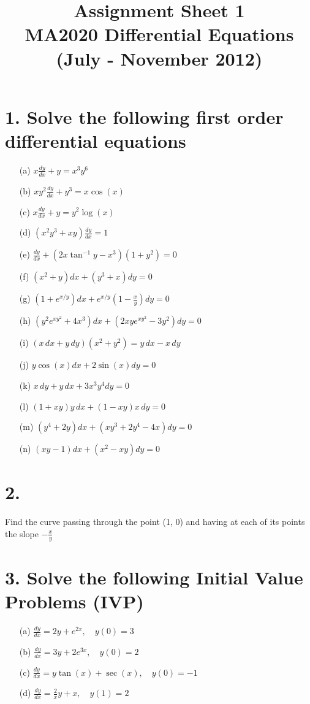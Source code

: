 \documentclass[12pt]{article}
\title{Assignment Sheet 1\\ \large MA2020 Differential Equations (July - November 2012)}
\date{}
\begin{document}
\maketitle

\section*{1. Solve the following first order differential equations}

\begin{enumerate}
  \item[(a)] $ x \frac{dy}{dx} + y = x^3 y^6 $
  \item[(b)] $ x y^2 \frac{dy}{dx} + y^3 = x \cos(x) $
  \item[(c)] $ x \frac{dy}{dx} + y = y^2 \log(x) $
  \item[(d)] $ (x^2 y^3 + x y) \frac{dy}{dx} = 1 $
  \item[(e)] $ \frac{dy}{dx} + (2x \tan^{-1} y - x^3)(1 + y^2) = 0 $
  \item[(f)] $ (x^2 + y)dx + (y^3 + x)dy = 0 $
  \item[(g)] $ (1 + e^{x/y})dx + e^{x/y}\left(1 - \frac{x}{y}\right)dy = 0 $
  \item[(h)] $ (y^2 e^{x y^2} + 4x^3)dx + (2x y e^{x y^2} - 3y^2)dy = 0 $
  \item[(i)] $ (x\,dx + y\,dy)(x^2 + y^2) = y\,dx - x\,dy $
  \item[(j)] $ y \cos(x)dx + 2 \sin(x)dy = 0 $
  \item[(k)] $ x\,dy + y\,dx + 3x^3 y^4 dy = 0 $
  \item[(l)] $ (1 + xy)y\,dx + (1 - xy)x\,dy = 0 $
  \item[(m)] $ (y^4 + 2y)dx + (x y^3 + 2y^4 - 4x)dy = 0 $
  \item[(n)] $ (xy - 1)dx + (x^2 - xy)dy = 0 $
\end{enumerate}

\section*{2.}
Find the curve passing through the point (1, 0) and having at each of its points the slope $ -\frac{x}{y} $

\section*{3. Solve the following Initial Value Problems (IVP)}

\begin{enumerate}
  \item[(a)] $ \frac{dy}{dx} = 2y + e^{2x}, \quad y(0) = 3 $
  \item[(b)] $ \frac{dy}{dx} = 3y + 2e^{3x}, \quad y(0) = 2 $
  \item[(c)] $ \frac{dy}{dx} = y \tan(x) + \sec(x), \quad y(0) = -1 $
  \item[(d)] $ \frac{dy}{dx} = \frac{2}{x}y + x, \quad y(1) = 2 $
\end{enumerate}
\end{document}
